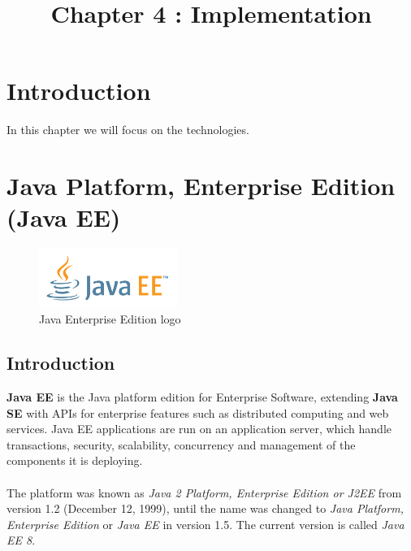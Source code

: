 \documentclass[12pt]{article}
\begin{document}
\listoffigures
	
\title{Chapter 4 : Implementation}
\maketitle
	\section{Introduction}
	
	In this chapter we will focus on the technologies. 
	\section{Java Platform, Enterprise Edition (Java EE)}
		\begin{figure}[h]
		\centering
		\includegraphics[width=0.4\textwidth]{JAVAEE_logo.png}
		\caption{Java Enterprise Edition logo}
		
	    \end{figure}

\subsection{Introduction}
\textbf{Java EE} is the Java platform edition for Enterprise Software, extending \textbf{Java SE} with APIs for enterprise features such as distributed computing and web services. Java EE applications are run on an application server, which handle transactions, security, scalability, concurrency and management of the components it is deploying.
\\
\\
The platform was known as \textit{Java 2 Platform, Enterprise Edition or J2EE} from version 1.2 (December 12, 1999), until the name was changed to \textit{Java Platform, Enterprise Edition} or \textit{Java EE} in version 1.5. The current version is called \textit{Java EE 8}.
\end{document}
